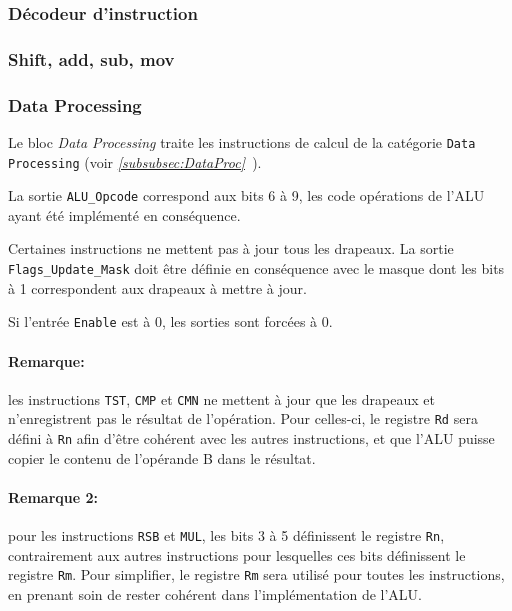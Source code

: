 \subsubsection{Décodeur d'instruction}

\subsubsection{Shift, add, sub, mov}

\subsubsection{Data Processing}



Le bloc \textit{Data Processing} traite les instructions de calcul de la catégorie \texttt{Data Processing} (voir \textit{\ref{subsubsec:DataProc}~}).

La sortie \texttt{ALU\_Opcode} correspond aux bits 6 à 9, les code opérations de l'ALU ayant été implémenté en conséquence.

Certaines instructions ne mettent pas à jour tous les drapeaux. La sortie \texttt{Flags\_Update\_Mask} doit être définie en conséquence avec le masque dont les bits à 1 correspondent aux drapeaux à mettre à jour.

Si l'entrée \texttt{Enable} est à 0, les sorties sont forcées à 0.

\paragraph{Remarque:} les instructions \texttt{TST}, \texttt{CMP} et \texttt{CMN} ne mettent à jour que les drapeaux et n'enregistrent pas le résultat de l'opération.
Pour celles-ci, le registre \texttt{Rd} sera défini à \texttt{Rn} afin d'être cohérent avec les autres instructions, et que l'ALU puisse copier le contenu de l'opérande B dans le résultat.


\paragraph{Remarque 2:} pour les instructions \texttt{RSB} et \texttt{MUL}, les bits 3 à 5 définissent le registre \texttt{Rn}, contrairement aux autres instructions pour lesquelles ces bits définissent le registre \texttt{Rm}.
Pour simplifier, le registre \texttt{Rm} sera utilisé pour toutes les instructions, en prenant soin de rester cohérent dans l'implémentation de l'ALU.


